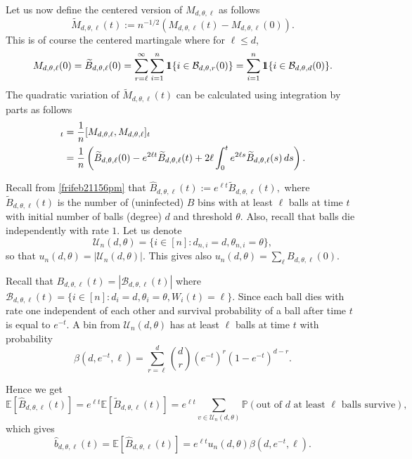 \documentclass[11pt]{article}
\def\ind{{\rm 1\hspace{-0.90ex}1}}
\newcommand{\cU}{\mathcal{U}}
\newcommand{\cB}{\mathcal{B}}
\begin{document}
Let us now define the centered version of $M_{d,\theta,\ell}$ as follows
\begin{equation}\label{eqn:1245pm25jan21}
\widetilde{M}_{d,\theta,\ell}(t) := n^{-1/2}(M_{d,\theta,\ell}(t) -{M}_{d,\theta,\ell}(0)).
\end{equation}
This is of course the centered martingale where for $\ell \leq d$,
\begin{equation*}
M_{d,\theta,\ell}(0) = \widetilde{B}_{d,\theta,\ell}(0) =  \sum_{r=\ell}^{\infty} \sum_{i=1}^{n}  \ind\{i \in \mathcal{B}_{d,\theta,r}(0)\} = \sum_{i=1}^{n}  \ind\{i \in \mathcal{B}_{d,\theta,d}(0)\}  .
\end{equation*}
The quadratic variation of $\widetilde{M}_{d,\theta,\ell}(t)$ can be calculated using integration by parts as follows
\begin{align*}%
[\widetilde{M}_{d,\theta,\ell}, \widetilde{M}_{d,\theta,\ell}]_t &= \frac{1}{n}[M_{d,\theta,\ell},M_{d,\theta,\ell}]_t \notag \\
&= \frac{1}{n}\left(\widetilde{B}_{d,\theta,\ell}(0) - e^{2\ell t}\widetilde{B}_{d,\theta,\ell}(t) + 2\ell  \int_{0}^t e^{2\ell s}\widetilde{B}_{d,\theta,\ell}(s) \, ds\right).
\end{align*}


Recall from \eqref{frifeb21156pm} that  $\widehat{B}_{d,\theta,\ell}(t) := e^{\ell t} \widetilde{B}_{d,\theta,\ell}(t),$ 
where $\widetilde{B}_{d,\theta,\ell}(t)$ is the number of (uninfected) $B$ bins with at least $\ell$ balls at time $t$ with initial number of balls (degree) $d$ and threshold $\theta$. Also, recall that balls die independently with rate $1$. Let us denote $$\cU_n(d,\theta) = \{i\in [n]: d_{n,i}=d, \theta_{n,i}=\theta\},$$ so that $u_n(d,\theta) = |\cU_n(d,\theta)|$. 
This gives also $u_{n}(d,\theta) = \sum_{\ell}B_{d,\theta,\ell}(0)$. 

Recall that $B_{d, \theta, \ell}(t) = |\cB_{d,\theta,\ell}(t)|$ where $\cB_{d,\theta,\ell}(t) = \{i\in [n]: d_i=d, \theta_i=\theta, W_i(t)=\ell\}$. Since each ball dies with rate one independent of each other and survival probability of a ball after time $t$ is equal to $e^{-t}$. A bin from $\cU_n(d,\theta)$ has at least $\ell$ balls at time $t$ with probability
\begin{equation*}
\beta(d,e^{-t},\ell) = \sum_{r=\ell}^d{d \choose r} (e^{-t})^r (1-e^{-t})^{d-r}. 
\end{equation*}

Hence we get
\begin{equation*}%
\mathbb{E}[\widehat{B}_{d,\theta,\ell}(t)] = e^{\ell t}  \mathbb{E}[\widetilde{B}_{d,\theta,\ell}(t)] = e^{\ell t} \sum_{v \in \cU_{n}(d,\theta)}\mathbb{P}(\text{out of  }d \text{  at least  } \ell \text{  balls survive} ) ,
\end{equation*}
which gives
\begin{equation*}%
\widehat{b}_{d,\theta,\ell}(t)=\mathbb{E}[\widehat{B}_{d,\theta,\ell}(t)] = e^{\ell t}  u_{n}(d,\theta) \beta(d,e^{-t},\ell).
\end{equation*}
\end{document}
